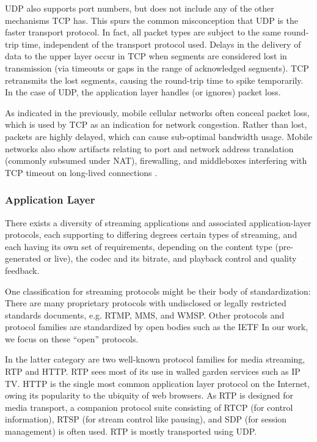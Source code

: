 UDP also supports port numbers, but does not include any of the other mechanisms \gls{TCP} has. This spurs the common misconception that \gls{UDP} is the faster transport protocol. In fact, all packet types are subject to the same round-trip time, independent of the transport protocol used. Delays in the delivery of data to the upper layer occur in \gls{TCP} when segments are considered lost in transmission (via timeouts or gaps in the range of acknowledged segments). \gls{TCP} retransmits the lost segments, causing the round-trip time to spike temporarily. In the case of \gls{UDP}, the application layer handles (or ignores) packet loss.

As indicated in the previously, mobile cellular networks often conceal packet loss, which is used by TCP as an indication for network congestion. Rather than lost, packets are highly delayed, which can cause sub-optimal bandwidth usage. Mobile networks also show artifacts relating to port and network address translation (commonly subsumed under \gls{NAT}), firewalling, and middleboxes interfering with \gls{TCP} timeout on long-lived connections \cite{sigcomm11middleboxes}.

\subsubsection{Application Layer}

There exists a diversity of streaming applications and associated application-layer protocols, each supporting to differing degrees certain types of streaming, and each having its own set of requirements, depending on the content type (pre-generated or live), the codec and its bitrate, and playback control and quality feedback.

One classification for streaming protocols might be their body of standardization: There are many proprietary protocols with undisclosed or legally restricted standards documents, e.g. \gls{RTMP}, \gls{MMS}, and \gls{WMSP}. Other protocols and protocol families are standardized by open bodies such as the \gls{IETF} In our work, we focus on these ``open'' protocols.

In the latter category are two well-known protocol families for media streaming, \gls{RTP} and \gls{HTTP}. \gls{RTP} sees most of its use in walled garden services such as IP TV. HTTP is the single most common application layer protocol on the Internet, owing its popularity to the ubiquity of web browsers. As \gls{RTP} is designed for media transport, a companion protocol suite consisting of \gls{RTCP} (for control information), \gls{RTSP} (for stream control like pausing), and \gls{SDP} (for session management) is often used. \gls{RTP} is mostly transported using \gls{UDP}.

